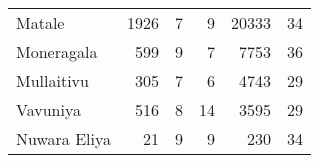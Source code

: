 \begin{tabular}{lrrrrr}
Matale       &        1926 &           7 &            9 &            20333 &          34 \\
Moneragala   &         599 &           9 &            7 &             7753 &          36 \\
Mullaitivu   &         305 &           7 &            6 &             4743 &          29 \\
Vavuniya     &         516 &           8 &           14 &             3595 &          29 \\
Nuwara Eliya &          21 &           9 &            9 &              230 &          34 \\
\bottomrule
\end{tabular}
